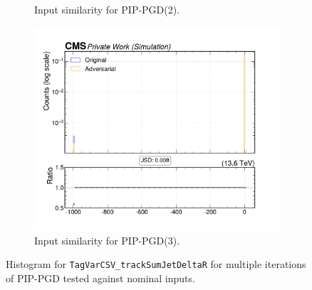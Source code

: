 \begin{figure}[htbp]
\begin{subfigure}[t]{0.32\textwidth}
    \caption*{Input similarity for PIP-PGD(2).}
  \end{subfigure}\hfill
  \begin{subfigure}[t]{0.32\textwidth}
    \includegraphics[width=\linewidth]{media/output/features/compare/combined_it_3/cmp_global_features_TagVarCSV_trackSumJetDeltaR.pdf}
    \caption*{Input similarity for PIP-PGD(3).}
  \end{subfigure}

  \caption*{Histogram for \texttt{TagVarCSV\_trackSumJetDeltaR} for multiple iterations of PIP-PGD tested against nominal inputs.}
  \label{fig:combined_input_TagVarCSV_trackSumJetDeltaR}
\end{figure}

